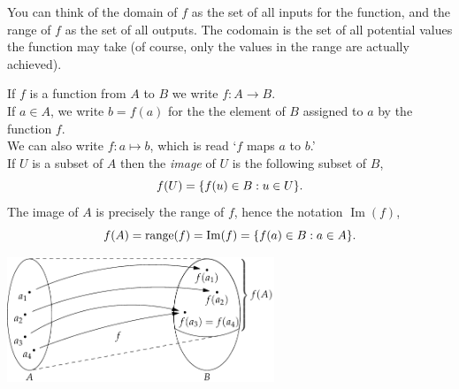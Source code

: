  You can think of the domain of $f$ as the set of all inputs for the function, and the range of $f$ as the set of all outputs. The codomain is the set of all potential values the function may take (of course, only the values in the range are actually achieved).


If $f$ is a function from $A$ to $B$ we write $f:A\to B$.\\
If $a\in A$, we write $b=f(a)$ for the the element of $B$ assigned to $a$ by the function $f$.\\
We can also write $f:a\mapsto b$, which is read `$f$ maps $a$ to $b$.'\\
If $U$ is a subset of $A$ then the \emph{image} of $U$ is the following subset of $B$,\vspace{-4pt}
\[f(U)=\{f(u)\in B:u\in U\}.\vspace{-5pt}\]
The image of $A$ is precisely the range of $f$, hence the notation $\operatorname{Im}(f)$,\vspace{-4pt}
\[f(A)=\range(f)=\operatorname{Im}(f)=\{f(a)\in B:a\in A\}.\vspace{-2pt}\]


\begin{center}
\includegraphics[width=0.6\textwidth]{sets-16-funcdef}
\end{center}



